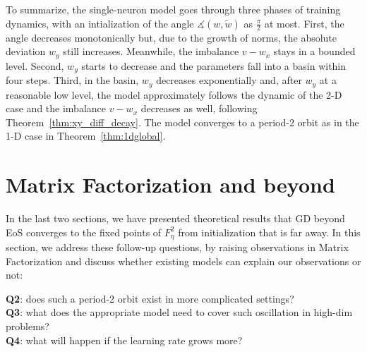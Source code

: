 \documentclass{article}
\theoremstyle{plain}
\theoremstyle{remark}
\newcommand{\norm}[1]{\left\lVert#1\right\rVert}
\newcommand{\crr}[1]{\noindent{\color{red}{#1}}}  %
\begin{document}

To summarize, the single-neuron model goes through three phases of training dynamics, with an intialization of the angle $\measuredangle(w,\tilde{w})$ as $\frac{\pi}{2}$ at most. First, the angle decreases monotonically but, due to the growth of norms, the absolute deviation $w_y$ still increases. Meanwhile, the imbalance $v-w_x$ stays in a bounded level. Second, $w_y$ starts to decrease and the parameters fall into a basin within four steps. Third, in the basin, $w_y$ decreases exponentially and, after $w_y$ at a reasonable low level, the model approximately follows the dynamic of the 2-D case and the imbalance $v-w_x$ decreases as well, following Theorem~\ref{thm:xy_diff_decay}. The model converges to a period-2 orbit as in the 1-D case in Theorem~\ref{thm:1dglobal}.

\section{Matrix Factorization and beyond}
\label{sec:new_mf}

In the last two sections, we have presented theoretical results that GD beyond EoS converges to the fixed points of $F^2_\eta$ from initialization that is far away. In this section, we address these follow-up questions, by raising observations in Matrix Factorization and discuss whether existing models can explain our observations or not:

\begin{center}
    \textbf{Q2}: does such a period-2 orbit exist in more complicated settings?\\
    \textbf{Q3}: what does the appropriate model need to cover such oscillation in high-dim problems? \\
    \textbf{Q4}: what will happen if the learning rate grows more?
\end{center}

\end{document}
